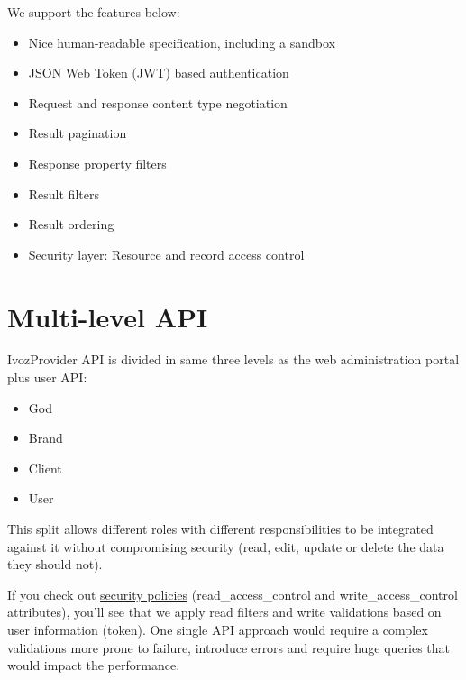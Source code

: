 \documentclass[letterpaper,10pt,english]{sphinxmanual}
\begin{document}
We support the features below:
\begin{itemize}
\item {} 
Nice human-readable specification, including a sandbox

\item {} 
JSON Web Token (JWT) based authentication

\item {} 
Request and response content type negotiation

\item {} 
Result pagination

\item {} 
Response property filters

\item {} 
Result filters

\item {} 
Result ordering

\item {} 
Security layer: Resource and record access control

\end{itemize}


\chapter{Multi-level API}
\label{api_rest/multilevel::doc}\label{api_rest/multilevel:multi-level-api}
IvozProvider API is divided in same three levels as the web administration portal plus user API:
\begin{itemize}
\item {} 
God

\item {} 
Brand

\item {} 
Client

\item {} 
User

\end{itemize}

This split allows different roles with different responsibilities to be integrated against it without compromising
security (read, edit, update or delete the data they should not).

If you check out \href{https://github.com/irontec/ivozprovider/blob/bleeding/web/rest/brand/config/api/raw/provider.yml}{security policies}
(read\_access\_control and write\_access\_control attributes), you’ll see that we apply
read filters and write validations based on user information (token). One single API approach would require a complex
validations more prone to failure, introduce errors and require huge queries that would impact the performance.
\end{document}
